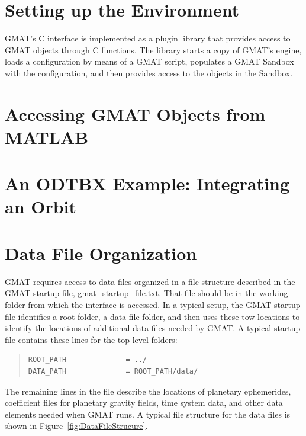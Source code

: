 \documentclass[letterpaper,10pt]{article}
\begin{document}
\section{Setting up the Environment}

GMAT's C interface is implemented as a plugin library that provides access to GMAT objects through C functions.  The library starts a copy of GMAT's engine, loads a configuration by means of a GMAT script, populates a GMAT Sandbox with the configuration, and then provides access to the objects in the Sandbox.

\section{Accessing GMAT Objects from MATLAB}

\section{An ODTBX Example: Integrating an Orbit}

\appendix

\section{Data File Organization}

GMAT requires access to data files organized in a file structure described in the GMAT startup file, gmat\_startup\_file.txt.  That file should be in the working folder from which the interface is accessed.  In a typical setup, the GMAT startup file identifies a root folder, a data file folder, and then uses these tow locations to identify the locations of additional data files needed by GMAT.  A typical startup file contains these lines for the top level folders:

\begin{quote}
\begin{verbatim}
ROOT_PATH              = ../
DATA_PATH              = ROOT_PATH/data/
\end{verbatim}
\end{quote}

\noindent The remaining lines in the file describe the locations of planetary ephemerides, coefficient files for planetary gravity fields, time system data, and other data elements needed when GMAT runs.  A typical file structure for the data files is shown in Figure~\ref{fig:DataFileStrucure}.
\end{document}
